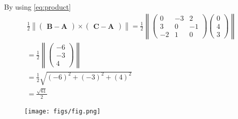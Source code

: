 \documentclass[12pt]{article}\usepackage{graphicx}
\newcommand{\myvec}[1]{\ensuremath{\begin{pmatrix}#1\end{pmatrix}}}
\let\vec\mathbf
\let\vec\mathbf
\providecommand{\norm}[1]{\left\lVert#1\right\rVert}
\begin{document}
\begin{enumerate}
By using \eqref{eq:product}
\begin{align}
          \frac{1}{2}\norm{\myvec{\vec{B}-\vec{A}}\times\myvec{\vec{C}-\vec{A}}}=\frac{1}{2}\norm{\myvec{0&-3&2\\3&0&-1\\-2&1&0}\myvec{0\\4\\3}}\\
          =\frac{1}{2}\norm{\myvec{-6\\-3\\4}}\\
          =\frac{1}{2}\sqrt{(-6)^2+(-3)^2+(4)^2}\\
          =\frac{\sqrt{61}}{2}
\end{align}
\begin{figure}[!h]
 \begin{center}
  \texttt{[image: figs/fig.png]}
 \end{center}
\caption{}
\label{fig:Fig1}
\end{figure}
\end{enumerate}
\end{document}
